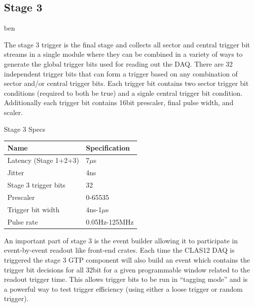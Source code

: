 \subsection{Stage 3} ben

The stage 3 trigger is the final stage and collects all sector and central trigger bit streams in a single module where they can be combined in a variety of ways to generate the global trigger bits used for reading out the DAQ. There are 32 independent trigger bits that can form a trigger based on any combination of sector and/or central trigger bits. Each trigger bit contains two sector trigger bit conditions (required to both be true) and a signle central trigger bit condition. Additionally each trigger bit contains 16bit prescaler, final pulse width, and scaler.

\begin{center}
	Stage 3 Specs\\
	\begin{tabular}{| l | l |}
		\hline \hline
		Name				& Specification	\\
		\hline
		Latency (Stage 1+2+3)		& 7$\mu$s	\\
		Jitter				& 4ns		\\
		Stage 3 trigger bits		& 32		\\
		Prescaler			& 0-65535	\\
		Trigger bit width		& 4ns-1$\mu$s	\\
		Pulse rate			& 0.05Hz-125MHz	\\
		\hline \hline
	\end{tabular}
\end{center}

An important part of stage 3 is the event builder allowing it to participate in event-by-event readout like front-end crates. Each time the CLAS12 DAQ is triggered the stage 3 GTP component will also build an event which contains the trigger bit decisions for all 32bit for a given programmable window related to the readout trigger time. This allows trigger bits to be run in ``tagging mode'' and is a powerful way to test trigger efficiency (using either a loose trigger or random trigger).